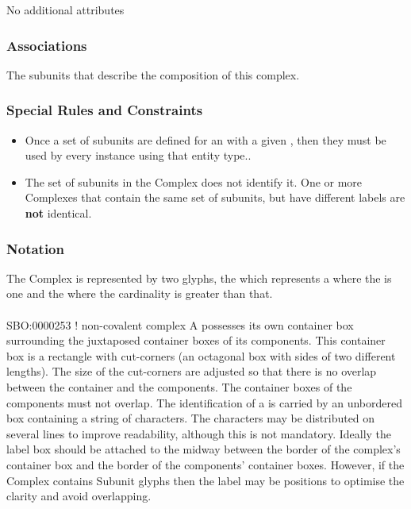 No additional attributes 

\subsubsection{Associations}

\begin{attributes}
   The subunits that describe
  the composition of this complex.
 \end{attributes}


\subsubsection{Special Rules and Constraints}

\begin{itemize}
\item Once a set of subunits are defined for an 
  with a given , then they must be used by every
  instance using that entity type..
\item The set of subunits in the Complex does not identify it. One or
  more Complexes that contain the same set of subunits, but have
  different labels are \textbf{not} identical.
\end{itemize}

\subsubsection{Notation}

The Complex is represented by two glyphs, the 
which represents a  where the 
is one and the  where the cardinality is
greater than that.

\paragraph{}

\begin{glyphDescription}
\glyphSboTerm SBO:0000253 ! non-covalent complex
\glyphContainer A  possesses its own container box surrounding the juxtaposed container boxes of its components.  This container box is a rectangle with cut-corners (an octagonal box with sides of two different lengths).  The size of the cut-corners are adjusted so that there is no overlap between the container and the components.  The container boxes of the components must not overlap.
\glyphLabel The identification of a  is carried
by an unbordered box containing a string of characters.  The
characters may be distributed on several lines to improve readability,
although this is not mandatory.  Ideally the label box should be
attached to the midway between the border of the complex's container
box and the border of the components' container boxes. However, if the
Complex contains Subunit glyphs then the label may be positions to
optimise the clarity and avoid overlapping.
\end{glyphDescription}

